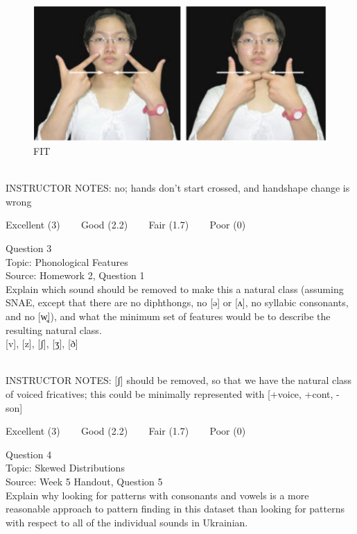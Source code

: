 \documentclass[12pt]{article}
\begin{document}
\begin{figure}[H]
\includegraphics{../images/taiwansign_fit.png}
\caption{FIT}
\end{figure}

~\\
INSTRUCTOR NOTES: no; hands don't start crossed, and handshape change is wrong


\vfill
Excellent (3) ~~~ Good (2.2) ~~~ Fair (1.7) ~~~ Poor (0)
\newpage

{\large Question 3}\\

Topic: Phonological Features\\
Source: Homework 2, Question 1\\

Explain which sound should be removed to make this a natural class (assuming SNAE, except that there are no diphthongs, no [ə] or [ʌ], no syllabic consonants, and no [w̥]), and what the minimum set of features would be to describe the resulting natural class.\\

{[v]}, {[z]}, {[ʃ]}, {[ʒ]}, {[ð]}


~\\
INSTRUCTOR NOTES: [ʃ] should be removed, so that we have the natural class of voiced fricatives; this could be minimally represented with [+voice, +cont, -son]


\vfill
Excellent (3) ~~~ Good (2.2) ~~~ Fair (1.7) ~~~ Poor (0)
\newpage

{\large Question 4}\\

Topic: Skewed Distributions\\
Source: Week 5 Handout, Question 5\\

Explain why looking for patterns with consonants and vowels is a more reasonable approach to pattern finding in this dataset than looking for patterns with respect to all of the individual sounds in Ukrainian.\\
\end{document}
